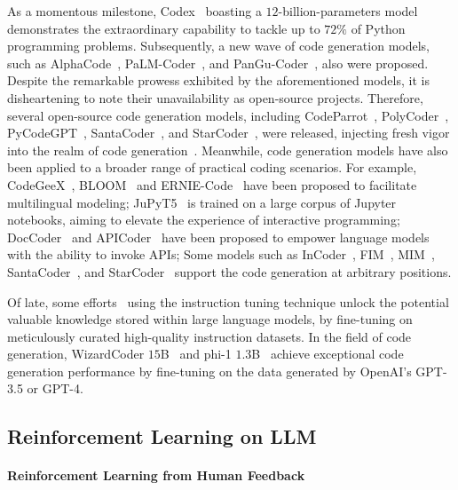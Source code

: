 \documentclass{article}
\begin{document}
As a momentous milestone, Codex~\cite{codex} boasting a $12$-billion-parameters model demonstrates the extraordinary capability to tackle up to $72\%$ of Python programming problems. Subsequently, a new wave of code generation models, such as AlphaCode~\cite{alphacode}, PaLM-Coder~\cite{palm}, and PanGu-Coder~\cite{pangu-coder}, also were proposed. Despite the remarkable prowess exhibited by the aforementioned models, it is disheartening to note their unavailability as open-source projects. Therefore, several open-source code generation models, including CodeParrot~\cite{codeparrot}, PolyCoder~\cite{polycoder}, PyCodeGPT~\cite{cert}, SantaCoder~\cite{santacoder}, and StarCoder~\cite{starcoder}, were released, injecting fresh vigor into the realm of code generation~\cite{codet}. Meanwhile, code generation models have also been applied to a broader range of practical coding scenarios. For example, CodeGeeX~\cite{codegeex}, BLOOM~\cite{bloom} and ERNIE-Code~\cite{ernie-code} have been proposed to facilitate multilingual modeling; JuPyT5~\cite{jupyt5} is trained on a large corpus of Jupyter notebooks, aiming to elevate the experience of interactive programming; DocCoder~\cite{doccoder} and APICoder~\cite{apicoder} have been proposed to empower language models with the ability to invoke APIs; Some models such as InCoder~\cite{incoder}, FIM~\cite{fim}, MIM~\cite{mim}, SantaCoder~\cite{santacoder}, and StarCoder~\cite{starcoder} support the code generation at arbitrary positions.

Of late, some efforts~\cite{lima,instruction-2} using the instruction tuning technique unlock the potential valuable knowledge stored within large language models, by fine-tuning on meticulously curated high-quality instruction datasets.
In the field of code generation, WizardCoder $15$B~\cite{wizardcoder} and phi-1 $1.3$B~\cite{phi-1} achieve exceptional code generation performance by fine-tuning on the data generated by OpenAI's GPT-3.5 or GPT-4.



\subsection{Reinforcement Learning on LLM}


\paragraph{Reinforcement Learning from Human Feedback}
\end{document}
